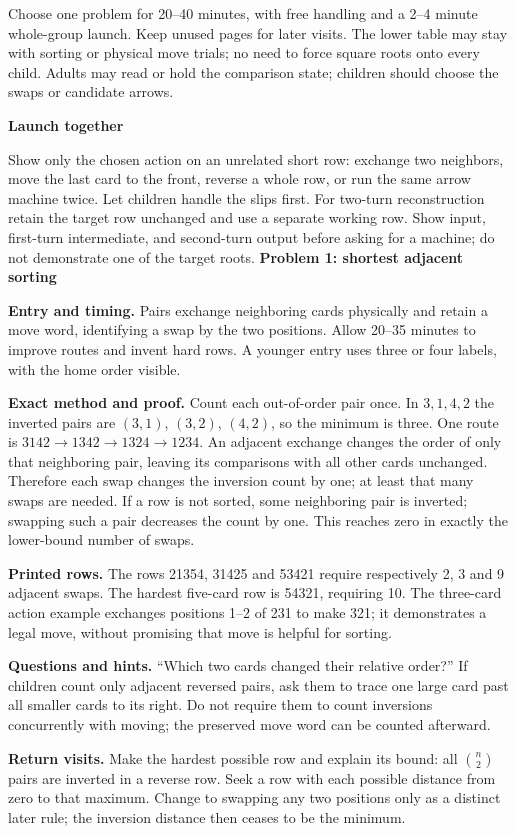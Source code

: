 \documentclass[11pt]{article}
\newcommand\lead[1]{\textbf{#1}\par}
\begin{document}
Choose one problem for 20--40 minutes, with free handling and a 2--4 minute whole-group launch. Keep unused pages for later visits. The lower table may stay with sorting or physical move trials; no need to force square roots onto every child. Adults may read or hold the comparison state; children should choose the swaps or candidate arrows.

\lead{Launch together}
Show only the chosen action on an unrelated short row: exchange two neighbors, move the last card to the front, reverse a whole row, or run the same arrow machine twice. Let children handle the slips first. For two-turn reconstruction retain the target row unchanged and use a separate working row. Show input, first-turn intermediate, and second-turn output before asking for a machine; do not demonstrate one of the target roots.
\newpage
\lead{Problem 1: shortest adjacent sorting}
\textbf{Entry and timing.} Pairs exchange neighboring cards physically and retain a move word, identifying a swap by the two positions. Allow 20--35 minutes to improve routes and invent hard rows. A younger entry uses three or four labels, with the home order visible.

\textbf{Exact method and proof.} Count each out-of-order pair once. In $3,1,4,2$ the inverted pairs are $(3,1)$, $(3,2)$, $(4,2)$, so the minimum is three. One route is $3142\to\allowbreak 1342\to\allowbreak 1324\to\allowbreak 1234$. An adjacent exchange changes the order of only that neighboring pair, leaving its comparisons with all other cards unchanged. Therefore each swap changes the inversion count by one; at least that many swaps are needed. If a row is not sorted, some neighboring pair is inverted; swapping such a pair decreases the count by one. This reaches zero in exactly the lower-bound number of swaps.

\textbf{Printed rows.} The rows 21354, 31425 and 53421 require respectively 2, 3 and 9 adjacent swaps. The hardest five-card row is 54321, requiring 10. The three-card action example exchanges positions 1--2 of 231 to make 321; it demonstrates a legal move, without promising that move is helpful for sorting.

\textbf{Questions and hints.} ``Which two cards changed their relative order?'' If children count only adjacent reversed pairs, ask them to trace one large card past all smaller cards to its right. Do not require them to count inversions concurrently with moving; the preserved move word can be counted afterward.

\textbf{Return visits.} Make the hardest possible row and explain its bound: all $\binom n 2$ pairs are inverted in a reverse row. Seek a row with each possible distance from zero to that maximum. Change to swapping any two positions only as a distinct later rule; the inversion distance then ceases to be the minimum.
\end{document}
